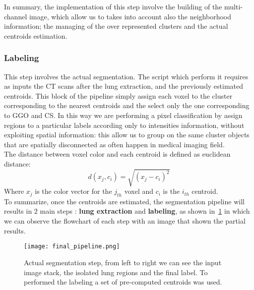 \documentclass{standalone}
\begin{document}
	In summary, the implementation of this step involve the building of the multi-channel image, which allow us to takes into account also the neighborhood information; the managing of the over represented clusters and the actual centroids estimation.

	\subsubsection*{Labeling}
	
	This step involves the actual segmentation. The script which perform it requires as inputs the CT scans after the lung extraction, and the previously estimated centroids. This block of the pipeline simply assign each voxel to the cluster corresponding to the nearest centroids and the select only the one corresponding to GGO and CS. In this way we are performing a pixel classification by assign regions to a particular labels according only to intensities information, without exploiting spatial information: this allow us to group on the same cluster objects that are spatially disconnected as often happen in medical imaging field.\\
	The distance between voxel color and each centroid is defined as euclidean distance:
	\begin{equation*}
		d(x_j, c_i) = \sqrt{(x_j - c_i)^2}
	\end{equation*} 
	Where $x_j$ is the color vector for the $j_{th}$ voxel and $c_i$ is the $i_{th}$ centroid.\\
	
	To summarize, once the centroids are estimated, the segmentation pipeline will results in $2$ main steps : \textbf{lung extraction} and \textbf{labeling}, as shown in \figurename\,\ref{fig:FinalPipeline} in which we can observe the flowchart of each step with an image that shown the partial results.
	
	\begin{figure}
		\centering
			\texttt{[image: final\_pipeline.png]}
			\caption{Actual segmentation step, from left to right we can see the input image stack, the isolated lung regions and the final label. To performed the labeling a set of pre-computed centroids was used.}\label{fig:FinalPipeline}
	\end{figure}
	
	
	
\end{document}
